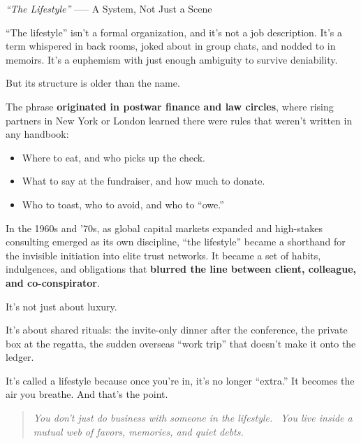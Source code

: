 \begin{HistoricalSidebar}{\textit{“The Lifestyle”} --— A System, Not Just a Scene}

  “The lifestyle” isn’t a formal organization, and it’s not a job description. It’s a term whispered in 
  back rooms, joked about in group chats, and nodded to in memoirs. It's a euphemism with just enough 
  ambiguity to survive deniability.

  \medskip
  
  But its structure is older than the name.
  
  \medskip
  
  The phrase \textbf{originated in postwar finance and law circles}, where rising partners in New York 
  or London learned there were rules that weren’t written in any handbook:

  \medskip
  
  \begin{itemize}
    \item Where to eat, and who picks up the check.
    \item What to say at the fundraiser, and how much to donate.
    \item Who to toast, who to avoid, and who to “owe.”
  \end{itemize}

  \medskip
  
  In the 1960s and ’70s, as global capital markets expanded and high-stakes consulting emerged as its own discipline, 
  “the lifestyle” became a shorthand for the invisible initiation into elite trust networks. It became a set of habits, 
  indulgences, and obligations that \textbf{blurred the line between client, colleague, and co-conspirator}.
  
  \medskip
  
  It’s not just about luxury.

  \medskip
  
  It’s about shared rituals: the invite-only dinner after the conference, the private box at the regatta, the sudden 
  overseas “work trip” that doesn’t make it onto the ledger.
  
  \medskip
  
  It’s called a lifestyle because once you’re in, it’s no longer “extra.” It becomes the air you breathe. And that’s 
  the point.
  
  \begin{quote}
    \textit{You don’t just do business with someone in the lifestyle.} \
    \textit{You live inside a mutual web of favors, memories, and quiet debts.}
  \end{quote}


\end{HistoricalSidebar}
